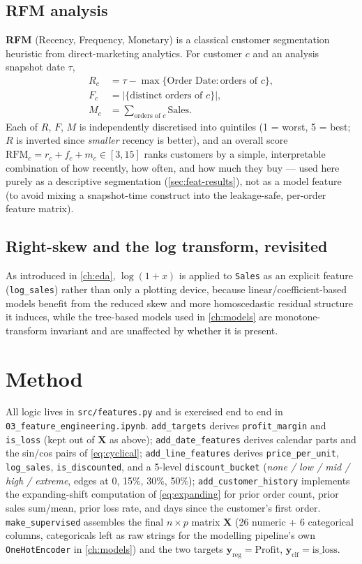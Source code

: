 \subsection{RFM analysis}
\textbf{RFM} (Recency, Frequency, Monetary) is a classical customer
segmentation heuristic from direct-marketing analytics. For customer $c$
and an analysis snapshot date $\tau$,
\begin{align}
  R_c &= \tau - \max\{\text{Order Date} : \text{orders of } c\}, \\
  F_c &= \bigl|\{\text{distinct orders of } c\}\bigr|, \\
  M_c &= \sum_{\text{orders of } c} \text{Sales}.
\end{align}
Each of $R$, $F$, $M$ is independently discretised into quintiles
(1 = worst, 5 = best; $R$ is inverted since \emph{smaller} recency is
better), and an overall score $\mathrm{RFM}_c = r_c+f_c+m_c \in [3,15]$
ranks customers by a simple, interpretable combination of how recently,
how often, and how much they buy — used here purely as a descriptive
segmentation (\cref{sec:feat-results}), not as a model feature (to avoid
mixing a snapshot-time construct into the leakage-safe, per-order feature
matrix).

\subsection{Right-skew and the log transform, revisited}
As introduced in \cref{ch:eda}, $\log(1+x)$ is applied to \texttt{Sales}
as an explicit feature (\texttt{log\_sales}) rather than only a plotting
device, because linear/coefficient-based models benefit from the reduced
skew and more homoscedastic residual structure it induces, while the
tree-based models used in \cref{ch:models} are monotone-transform
invariant and are unaffected by whether it is present.

\section{Method}
All logic lives in \texttt{src/features.py} and is exercised end to end
in \texttt{03\_feature\_engineering.ipynb}. \texttt{add\_targets} derives
\texttt{profit\_margin} and \texttt{is\_loss} (kept out of $\mathbf{X}$
as above); \texttt{add\_date\_features} derives calendar parts and the
sin/cos pairs of \cref{eq:cyclical}; \texttt{add\_line\_features} derives
\texttt{price\_per\_unit}, \texttt{log\_sales}, \texttt{is\_discounted},
and a 5-level \texttt{discount\_bucket} (\emph{none / low / mid / high /
extreme}, edges at 0, 15\%, 30\%, 50\%); \texttt{add\_customer\_history}
implements the expanding-shift computation of \cref{eq:expanding} for
prior order count, prior sales sum/mean, prior loss rate, and days since
the customer's first order. \texttt{make\_supervised} assembles the final
$n\times p$ matrix $\mathbf{X}$ (26 numeric + 6 categorical columns,
categoricals left as raw strings for the modelling pipeline's own
\texttt{OneHotEncoder} in \cref{ch:models}) and the two targets
$\mathbf{y}_{\text{reg}}=\text{Profit}$, $\mathbf{y}_{\text{clf}}=
\text{is\_loss}$.

